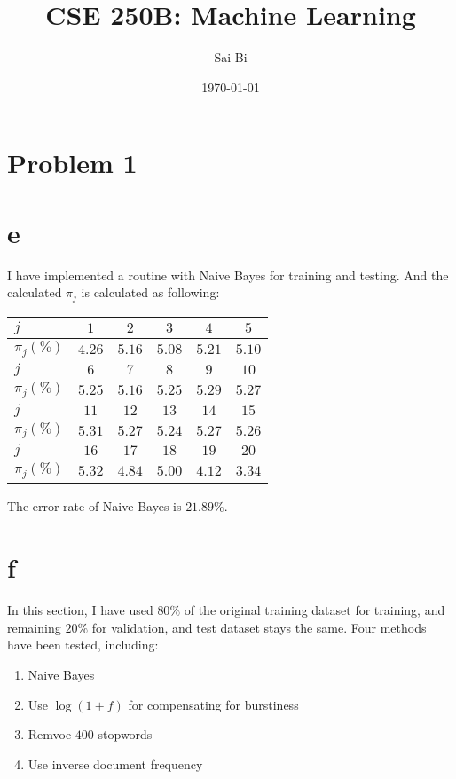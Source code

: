 \documentclass[a4paper,11pt]{article}
\theoremstyle{mytheor}
\begin{document}
\title{CSE 250B: Machine Learning}

\author{Sai Bi}

\date{\today}

\maketitle

\section*{Problem 1}

\section*{e}
I have implemented a routine with Naive Bayes for training and testing. And the calculated   $\pi_j$ is calculated as following:

\begin{center}
\begin{tabular}{|l|c|c|c|c|c|}
	\hline
	$j$ &$1$ &$2$ & $3$& $4$&  $5$ \\ \hline
	$\pi_j (\%)$ & $ 4.26$ & $ 5.16$ & $ 5.08$ & $ 5.21$ & $ 5.10$    \\ \hline
	
	$j$ & $6$ & $7$ & $8$& $9$&$10$  \\ \hline
	$\pi_j (\%)$ & $ 5.25$ & $ 5.16$ & $ 5.25$ & $ 5.29$ & $ 5.27$   \\ \hline
	
	$j$ & $11$& $12$& $13$&$14$ &  $15$\\ \hline
	$\pi_j (\%)$ & $ 5.31$ & $ 5.27$ & $ 5.24$ & $ 5.27$ & $ 5.26$  \\ \hline
	
	$j$ & $16$& $17$&$18$ & $19$&  $20$\\ \hline
	$\pi_j (\%)$ & $ 5.32$ & $ 4.84$ & $ 5.00$ & $ 4.12$ & $ 3.34$ \\ \hline
	
\end{tabular}
\end{center}

The error rate of Naive Bayes is $21.89\%$.

\section*{f}
In this section, I have used $80\%$ of the original training dataset for training,
and remaining $20\%$ for validation, and test dataset stays the same. Four methods
have been tested, including:
\begin{enumerate}
	\item Naive Bayes 
	\item Use $\log(1+f) $ for compensating for burstiness
	\item Remvoe  $400$ stopwords 
	\item Use inverse document frequency
\end{enumerate}
\end{document}
